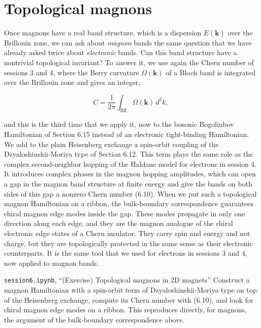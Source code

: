 

\section{Topological magnons}

Once magnons have a real band structure, which is a dispersion $E(\mathbf k)$ over the Brillouin zone,
we can ask about \emph{magnon} bands the same question that we have already asked twice about
\emph{electronic} bands. Can this band structure have a nontrivial topological invariant? To answer
it, we use again the Chern number of sessions 3 and 4, where the Berry curvature $\Omega(\mathbf k)$ of
a Bloch band is integrated over the Brillouin zone and gives an integer,

\begin{equation}
C = \frac{1}{2\pi}\int_\text{BZ} \Omega(\mathbf k)\, d^2k,
\end{equation}

and this is the third time that we apply it, now to the bosonic Bogoliubov Hamiltonian of Section 6.15
instead of an electronic tight-binding Hamiltonian. We add to the plain Heisenberg exchange a
spin-orbit coupling of the Dzyaloshinskii-Moriya type of Section 6.12. This term plays the same role
as the complex second-neighbor hopping of the Haldane model for electrons in session 4. It introduces
complex phases in the magnon hopping amplitudes, which can open a gap in the magnon band structure at
finite energy and give the bands on both sides of this gap a nonzero Chern number (6.10). When we put
such a topological magnon Hamiltonian on a ribbon, the bulk-boundary correspondence guarantees chiral
magnon edge modes inside the gap. These modes propagate in only one direction along each edge, and
they are the magnon analogue of the chiral electronic edge states of a Chern insulator. They carry spin
and energy and not charge, but they are topologically protected in the same sense as their electronic
counterparts. It is the same tool that we used for electrons in sessions 3 and 4, now applied to
magnon bands.

\begin{notebookbox}{\texttt{session6.ipynb}, ``(Exercise) Topological magnons in 2D magnets''}
Construct a magnon Hamiltonian with a spin-orbit term of Dzyaloshinskii-Moriya type on top of the
Heisenberg exchange, compute its Chern number with (6.10), and look for chiral magnon edge modes on a
ribbon. This reproduces directly, for magnons, the argument of the bulk-boundary correspondence above.
\end{notebookbox}


